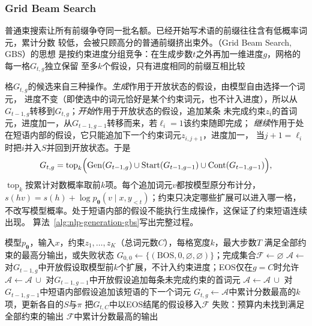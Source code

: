 \subsubsection{Grid Beam Search}
\label{sec:nlp-generation-gbs}

普通束搜索让所有前缀争夺同一批名额。已经开始写术语的前缀往往含有低概率词元，累计分数
较低，会被只顾高分的普通前缀挤出束外。（Grid Beam Search, GBS）的思想
是按约束进度分组竞争：在生成步数$t$之外再加一维进度$g$，网格的每一格$G_{t,g}$独立保留
至多$k$个假设，只有进度相同的前缀互相比较

格$G_{t,g}$的候选来自三种操作。\emph{生成}作用于开放状态的假设，由模型自由选择一个词元，
进度不变（即使选中的词元恰好是某个约束词元，也不计入进度），所以从$G_{t-1,g}$转移到$G_{t,g}$；\emph{开始}作用于开放状态的假设，追加某条
未完成约束$z_i$的首词元，进度加一，从$G_{t-1,g-1}$转移而来，若$\ell_i=1$该约束随即完成；
\emph{继续}作用于处在短语内部的假设，它只能追加下一个约束词元$z_{i,j+1}$，进度加一，
当$j+1=\ell_i$时把$i$并入$S$并回到开放状态。于是
\begin{equation}
  G_{t,g}=\operatorname{top}_k\Bigl(\mathrm{Gen}(G_{t-1,g})\cup
  \mathrm{Start}(G_{t-1,g-1})\cup\mathrm{Cont}(G_{t-1,g-1})\Bigr),
  \label{eq:nlp-generation-gbs}
\end{equation}
$\operatorname{top}_k$按累计对数概率取前$k$项。每个追加词元$v$都按模型原分布计分，
$s(hv)=s(h)+\log p_{\bm\theta}(v\mid x,y_{<t})$；约束只决定哪些扩展可以进入哪一格，
不改写模型概率。处于短语内部的假设不能执行生成操作，这保证了约束短语连续出现。
算法~\ref{alg:nlp-generation-gbs}写出完整过程。

\begin{algorithm}[网格束搜索]
  \label{alg:nlp-generation-gbs}
  \begin{algorithmic}[1]
    \Require 模型$p_{\bm\theta}$，输入$x$，约束$z_1,\ldots,z_K$（总词元数$C$），每格宽度$k$，最大步数$T$
    \Ensure 满足全部约束的最高分输出，或失败状态
    \State $G_{0,0}\gets\{(\mathrm{BOS},0,\varnothing,\varnothing)\}$；完成集合$\mathcal F\gets\varnothing$
        \State $\mathcal A\gets$ 对$G_{t-1,g}$中开放假设取模型前$k$个扩展，不计入约束进度；EOS仅在$g=C$时允许
        \State $\mathcal A\gets\mathcal A\,\cup$ 对$G_{t-1,g-1}$中开放假设追加每条未完成约束的首词元
        \State $\mathcal A\gets\mathcal A\,\cup$ 对$G_{t-1,g-1}$中短语内部假设追加该短语的下一个词元
        \State $G_{t,g}\gets\mathcal A$中累计分数最高的$k$项，更新各自的$S$与$\pi$
      \EndFor
      \State 把$G_{t,C}$中以EOS结尾的假设移入$\mathcal F$
    \EndFor
      \State \Return 失败：预算内未找到满足全部约束的输出
    \EndIf
    \State \Return $\mathcal F$中累计分数最高的输出
  \end{algorithmic}
\end{algorithm}

